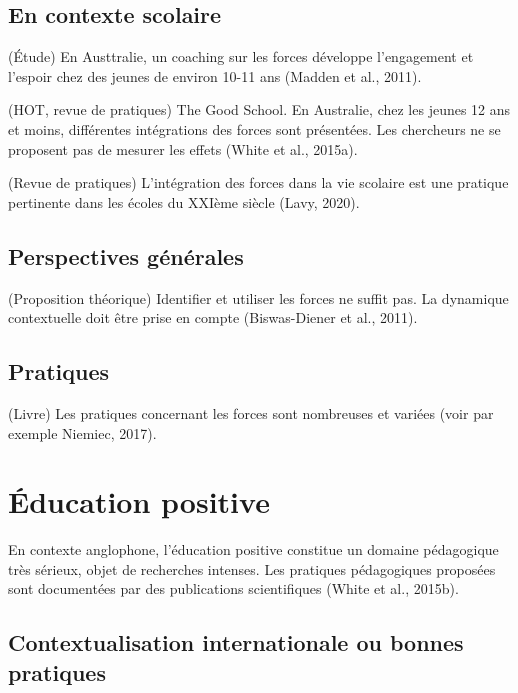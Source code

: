 \documentclass[
  french,
]{article}
\begin{document}
\hypertarget{en-contexte-scolaire}{%
\subsection{En contexte scolaire}\label{en-contexte-scolaire}}

(Étude) En Austtralie, un coaching sur les forces développe l'engagement et l'espoir chez des jeunes de environ 10-11 ans (Madden et al., 2011).

(HOT, revue de pratiques) The Good School. En Australie, chez les jeunes 12 ans et moins, différentes intégrations des forces sont présentées. Les chercheurs ne se proposent pas de mesurer les effets (White et al., 2015a).

(Revue de pratiques) L'intégration des forces dans la vie scolaire est une pratique pertinente dans les écoles du XXIème siècle (Lavy, 2020).

\hypertarget{perspectives-guxe9nuxe9rales}{%
\subsection{Perspectives générales}\label{perspectives-guxe9nuxe9rales}}

(Proposition théorique) Identifier et utiliser les forces ne suffit pas. La dynamique contextuelle doit être prise en compte (Biswas-Diener et al., 2011).

\hypertarget{pratiques-1}{%
\subsection{Pratiques}\label{pratiques-1}}

(Livre) Les pratiques concernant les forces sont nombreuses et variées (voir par exemple Niemiec, 2017).

\hypertarget{uxe9ducation-positive}{%
\section{Éducation positive}\label{uxe9ducation-positive}}

En contexte anglophone, l'éducation positive constitue un domaine pédagogique très sérieux, objet de recherches intenses. Les pratiques pédagogiques proposées sont documentées par des publications scientifiques (White et al., 2015b).

\hypertarget{contextualisation-internationale-ou-bonnes-pratiques}{%
\subsection{Contextualisation internationale ou bonnes pratiques}\label{contextualisation-internationale-ou-bonnes-pratiques}}
\end{document}
